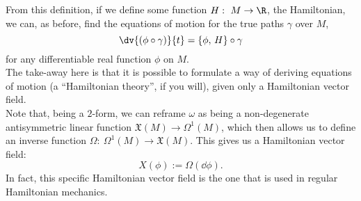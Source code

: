 \documentclass{article}
\begin{document}
\begin{multicols}{2}
	From this definition, if we define some function \(H:\ M\to\R\), the Hamiltonian, we can, as before, find the equations of motion for the true paths \(\gamma\) over \(M\),
	\begin{equation}
		\dv{(\phi\circ\gamma)}{t} = \{\phi,\,H\}\circ\gamma
	\end{equation}
	for any differentiable real function \(\phi\) on \(M\).\\
	The take-away here is that it is possible to formulate a way of deriving equations of motion (a ``Hamiltonian theory'', if you will), given only a Hamiltonian vector field.\\
	Note that, being a \(2\)-form, we can reframe \(\omega\) as being a non-degenerate antisymmetric linear function \(\mathfrak{X}(M)\to \Omega^1(M)\), which then allows us to define an inverse function \(\Omega:\ \Omega^1(M)\to\mathfrak{X}(M)\).
	This gives us a Hamiltonian vector field:
	\begin{equation}
		X(\phi) := \Omega(\dd \phi).
	\end{equation}
	In fact, this specific Hamiltonian vector field is the one that is used in regular Hamiltonian mechanics.

\end{multicols}
\end{document}
